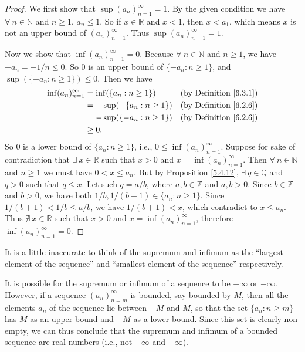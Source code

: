 \begin{proof}
We first show that \(\sup(a_n)_{n = 1}^\infty = 1\).
By the given condition we have \(\forall\ n \in \mathds{N}\) and \(n \geq 1\), \(a_n \leq 1\).
So if \(x \in \mathds{R}\) and \(x < 1\), then \(x < a_1\), which means \(x\) is not an upper bound of \((a_n)_{n = 1}^\infty\).
Thus \(\sup(a_n)_{n = 1}^\infty = 1\).

Now we show that \(\inf(a_n)_{n = 1}^\infty = 0\).
Because \(\forall\ n \in \mathds{N}\) and \(n \geq 1\), we have \(-a_n = -1 / n \leq 0\).
So \(0\) is an upper bound of \(\{-a_n : n \geq 1\}\), and \(\sup(\{-a_n : n \geq 1\}) \leq 0\).
Then we have
\begin{align*}
\inf(a_n)_{n = 1}^\infty &= \inf(\{a_n : n \geq 1\}) & \text{(by Definition \ref{6.3.1})} \\
&= -\sup(-\{a_n : n \geq 1\}) & \text{(by Definition \ref{6.2.6})} \\
&= -\sup(\{-a_n : n \geq 1\}) & \text{(by Definition \ref{6.2.6})} \\
&\geq 0.
\end{align*}
So \(0\) is a lower bound of \(\{a_n : n \geq 1\}\), i.e., \(0 \leq \inf(a_n)_{n = 1}^\infty\).
Suppose for sake of contradiction that \(\exists\ x \in \mathds{R}\) such that \(x > 0\) and \(x = \inf(a_n)_{n = 1}^\infty\).
Then \(\forall\ n \in \mathds{N}\) and \(n \geq 1\) we must have \(0 < x \leq a_n\).
But by Proposition \ref{5.4.12}, \(\exists\ q \in \mathds{Q}\) and \(q > 0\) such that \(q \leq x\).
Let such \(q = a / b\), where \(a, b \in \mathds{Z}\) and \(a, b > 0\).
Since \(b \in \mathds{Z}\) and \(b > 0\), we have both \(1 / b, 1 / (b + 1) \in \{a_n : n \geq 1\}\).
Since \(1 / (b + 1) < 1 / b \leq a / b\), we have \(1 / (b + 1) < x\), which contradict to \(x \leq a_n\).
Thus \(\nexists\ x \in \mathds{R}\) such that \(x > 0\) and \(x = \inf(a_n)_{n = 1}^\infty\), therefore \(\inf(a_n)_{n = 1}^\infty = 0\).
\end{proof}

\begin{note}
It is a little inaccurate to think of the supremum and infimum as the ``largest element of the sequence'' and ``smallest element of the sequence'' respectively.
\end{note}

\begin{note}
It is possible for the supremum or infimum of a sequence to be \(+\infty\) or \(-\infty\).
However, if a sequence \((a_n)_{n = m}^\infty\) is bounded, say bounded by \(M\), then all the elements \(a_n\) of the sequence lie between \(-M\) and \(M\), so that the set \(\{a_n : n \geq m\}\) has \(M\) as an upper bound and \(-M\) as a lower bound.
Since this set is clearly non-empty, we can thus conclude that the supremum and infimum of a bounded sequence are real numbers (i.e., not \(+\infty\) and \(-\infty\)).
\end{note}

